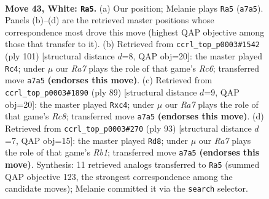 \documentclass[11pt]{article}
\begin{document}
\clearpage

\begin{figure}[p]\centering
\begin{subfigure}{0.46\textwidth}\centering
\resizebox{\linewidth}{!}{%
\newchessgame
\chessboard[
  setfen={6kr/R7/8/8/p7/P5K1/8/8 w - - 10 43},
  showmover=false,
  pgfstyle=straightmove, color=movearrow, markmove={a7-a5}
]}
\caption{}
\end{subfigure}\hfill
\begin{subfigure}{0.46\textwidth}\centering
\resizebox{\linewidth}{!}{%
\newchessgame
\chessboard[
  setfen={6k1/8/8/4KR2/7P/2r2P2/8/8 b - - 0 51},
  showmover=false,
  pgfstyle=straightmove, color=movearrow, markmove={c3-c4}
]}
\caption{}
\end{subfigure}
\\[4pt]
\begin{subfigure}{0.46\textwidth}\centering
\resizebox{\linewidth}{!}{%
\newchessgame
\chessboard[
  setfen={8/5k2/1K6/1R5p/2P5/8/7P/2r5 b - - 0 45},
  showmover=false,
  pgfstyle=straightmove, color=movearrow, markmove={c1-c4}
]}
\caption{}
\end{subfigure}\hfill
\begin{subfigure}{0.46\textwidth}\centering
\resizebox{\linewidth}{!}{%
\newchessgame
\chessboard[
  setfen={1r6/8/3P4/R7/1P1k4/K7/8/8 b - - 0 47},
  showmover=false,
  pgfstyle=straightmove, color=movearrow, markmove={b8-d8}
]}
\caption{}
\end{subfigure}
\caption{\textbf{Move 43, White: \texttt{Ra5}.} (a) Our position; Melanie plays \texttt{Ra5} (\texttt{a7a5}). Panels (b)--(d) are the retrieved master positions whose correspondence most drove this move (highest QAP objective among those that transfer to it). (b) Retrieved from \texttt{ccrl\_top\_p0003\#1542} (ply 101) [structural distance $d$=8, QAP obj=20]: the master played \texttt{Rc4}; under $\mu$ our \emph{Ra7} plays the role of that game's \emph{Rc6}; transferred move \texttt{a7a5} \textbf{(endorses this move)}. (c) Retrieved from \texttt{ccrl\_top\_p0003\#1890} (ply 89) [structural distance $d$=9, QAP obj=20]: the master played \texttt{Rxc4}; under $\mu$ our \emph{Ra7} plays the role of that game's \emph{Rc8}; transferred move \texttt{a7a5} \textbf{(endorses this move)}. (d) Retrieved from \texttt{ccrl\_top\_p0003\#270} (ply 93) [structural distance $d$=7, QAP obj=15]: the master played \texttt{Rd8}; under $\mu$ our \emph{Ra7} plays the role of that game's \emph{Rb1}; transferred move \texttt{a7a5} \textbf{(endorses this move)}. Synthesis: 11 retrieved analogs transferred to \texttt{Ra5} (summed QAP objective 123, the strongest correspondence among the candidate moves); Melanie committed it via the \texttt{search} selector.}
\label{fig:thought-m84}
\end{figure}
\end{document}
